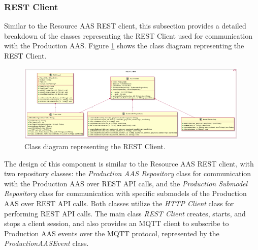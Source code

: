 \newpage
\subsubsection{REST Client}
Similar to the Resource AAS REST client, this subsection provides a detailed breakdown of the classes representing the REST Client used for communication with the Production AAS.
Figure \ref{fig:prod_rest_client_classes} shows the class diagram representing the REST Client.
\begin{figure}[ht]
    \centering  
    \includegraphics[width=0.99\textwidth]{Images/Production_Classes/Client.png}
    \caption{Class diagram representing the REST Client.}
    \label{fig:prod_rest_client_classes}
\end{figure}
The design of this component is similar to the Resource AAS REST client, with two repository classes: the \emph{Production AAS Repository} class for communication with the Production AAS over REST API calls, and the \emph{Production Submodel Repository} class for communication with specific submodels of the Production AAS over REST API calls.
Both classes utilize the \emph{HTTP Client} class for performing REST API calls.
The main class \emph{REST Client} creates, starts, and stops a client session, and also provides an MQTT client to subscribe to Production AAS events over the MQTT protocol, represented by the \emph{ProductionAASEvent} class.


\newpage
